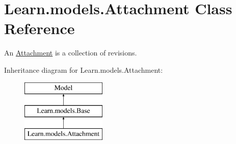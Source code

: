 \hypertarget{class_learn_1_1models_1_1_attachment}{\section{Learn.\-models.\-Attachment Class Reference}
\label{class_learn_1_1models_1_1_attachment}
}


An \hyperlink{class_learn_1_1models_1_1_attachment}{Attachment} is a collection of revisions.  


Inheritance diagram for Learn.\-models.\-Attachment\-:\begin{figure}[H]
\begin{center}
\leavevmode
\includegraphics[height=3.000000cm]{class_learn_1_1models_1_1_attachment}
\end{center}
\end{figure}
